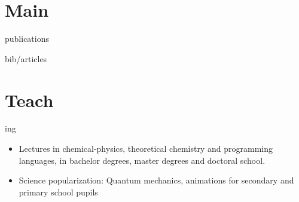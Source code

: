 \documentclass{cv-style}     %
\begin{document}
\vspace{-4mm}
\section{Main}{ publications}
\vspace{-0.2cm}
\nocite{aqturin2018_1, santos2017, vallverdu2016, guille2015, Martin2012, Maillet2011, Vallverdu2010}
\begin{btSect}{bib/articles}
    \btPrintCited
\end{btSect}


%


\section{Teach}{ing}
  \vspace{-0.2cm}

\begin{itemize}
    \item Lectures in chemical-physics, theoretical chemistry and programming languages, in bachelor
    degrees, master degrees and doctoral school.
    \item Science popularization: Quantum mechanics, animations for secondary and primary school pupils
\end{itemize}

\end{document}

